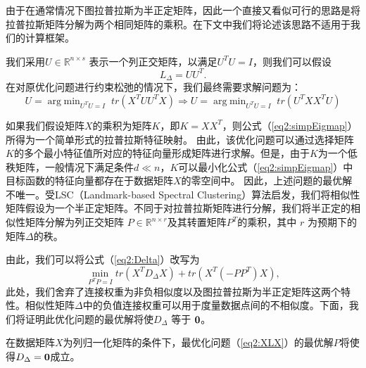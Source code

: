 由于在通常情况下图拉普拉斯为半正定矩阵，因此一个直接又看似可行的思路是将拉普拉斯矩阵分解为两个相同矩阵的乘积。在下文中我们将论述该思路不适用于我们的计算框架。

我们采用$U\in \mathbb{R}^{n\times s}$ 表示一个列正交矩阵，以满足$U^TU = I$，则我们可以假设
\begin{equation}
	L_\Delta = UU^T.
\end{equation}
在对原优化问题进行约束松弛的情况下，我们最终需要求解问题为：
\begin{equation}
		U = \mathop{\mathrm{arg\;min}}_{U^TU=I}\; tr(X^TUU^TX) 
		\Rightarrow U = \mathop{\mathrm{arg\;min}}_{U^TU=I} \;tr(U^TXX^TU)
	\label{eq2:simpEigmap}
\end{equation}

如果我们假设矩阵$X$的乘积为矩阵$K$，即$K = XX^T$，则公式（\ref{eq2:simpEigmap}）所得为一个简单形式的拉普拉斯特征映射\cite{belkin2001laplacian}。
由此，该优化问题可以通过选择矩阵$K$的多个最小特征值所对应的特征向量形成矩阵进行求解。但是，由于$K$为一个低秩矩阵，一般情况下满足条件$d\ll n$，$K$可以最小化公式（\ref{eq2:simpEigmap}）中目标函数的特征向量都存在于数据矩阵$X$的零空间中。
因此，上述问题的最优解不唯一。受LSC（Landmark-based Spectral Clustering）算法\cite{chen2011large}启发，我们将相似性矩阵假设为一个半正定矩阵。不同于对拉普拉斯矩阵进行分解，我们将半正定的相似性矩阵分解为列正交矩阵 $P\in \mathbb{R}^{n\times r}$及其转置矩阵$P^T$的乘积，其中 $r$ 为预期下的矩阵$\Delta$的秩。

由此，我们可以将公式（\ref{eq2:Delta}）改写为
\begin{equation}
	\mathop{\mathrm{min}}_{P^TP=I} tr(X^TD_\Delta X)+tr(X^T(-PP^T)X),
	\label{eq2:XLX}
\end{equation}
此处，我们舍弃了连接权重为非负相似度以及图拉普拉斯为半正定矩阵这两个特性。相似性矩阵$\Delta$中的负值连接权重可以用于度量数据点间的不相似度。下面，我们将证明此优化问题的最优解将使$D_\Delta$ 等于 $\bf0$。

\begin{proposition}
	\label{thm2}
	在数据矩阵$X$为列归一化矩阵的条件下，最优化问题（\ref{eq2:XLX}）的最优解$P$将使得$D_\Delta=\bf0$成立。
\end{proposition}

